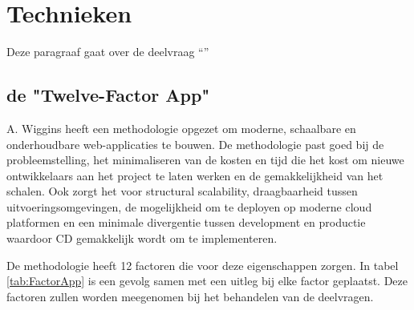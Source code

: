\chapter{Technieken}

\label{Chapter3}

Deze paragraaf gaat over de deelvraag \enquote{\deeltechnieken}

\section{de "Twelve-Factor App"}

A. Wiggins \parencite{12Factor} heeft een methodologie opgezet om moderne, schaalbare en onderhoudbare web-applicaties te bouwen. De methodologie past goed bij de probleemstelling, het minimaliseren van de kosten en tijd die het kost om nieuwe ontwikkelaars aan het project te laten werken en de gemakkelijkheid van het schalen. Ook zorgt het voor structural scalability, draagbaarheid tussen uitvoeringsomgevingen, de mogelijkheid om te deployen op moderne cloud platformen en een minimale divergentie tussen development en productie waardoor CD gemakkelijk wordt om te implementeren.

De methodologie heeft 12 factoren die voor deze eigenschappen zorgen. In tabel \ref{tab:FactorApp} is een gevolg samen met een uitleg bij elke factor geplaatst. Deze factoren zullen worden meegenomen bij het behandelen van de deelvragen.

